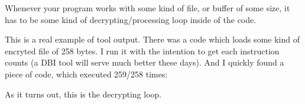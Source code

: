 
Whenever your program works with some kind of file, or buffer of some size,
it has to be some kind of decrypting/processing loop inside of the code.

This is a real example of \tracer tool output.
There was a code which loads some kind of encryted file of 258 bytes.
I run it with the intention to get each instruction counts (a \ac{DBI} tool will serve much better these days).
And I quickly found a piece of code, which executed 259/258 times:



As it turns out, this is the decrypting loop.

